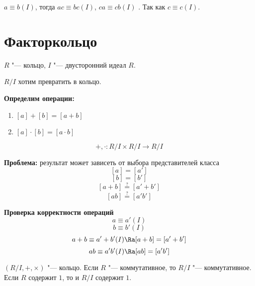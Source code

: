 \begin{conseq}	
	$a \equiv b (I)$, тогда
	$ac \equiv bc (I)$, $ca \equiv cb (I)$	.
	Так как $c \equiv c (I)$.
\end{conseq}

\section{Факторкольцо}

$R$ "--- кольцо, $I$ "--- двусторонний идеал $R$.

$R / I$ хотим превратить в кольцо.

\textbf{Определим операции:}
\begin{enumerate}
	\item $[a] + [b] = [a + b]$
	\item $[a] \cdot [b] = [a \cdot b]$
\end{enumerate}	
\[+, \cdot \colon R/I \times R/I \to R/I\]
	
\textbf{Проблема:}
результат может зависеть от выбора представителей класса
\[[a] = [a']\]
\[[b] = [b']\]
\[[a + b] \overset{?}{=} [a' + b']\]
\[[ab] \overset{?}{=} [a'b']\]
	
\textbf{Проверка корректности операций}
\[a \equiv a' (I)\]
\[b \equiv b' (I)\]
\[a + b \equiv a' + b' (I) \Ra [a + b] = [a' + b']\]
\[ab \equiv a'b' (I) \Ra [ab] = [a'b']\]
	
\begin{theorem}
	$(R/I, +, \times)$ "--- кольцо.
	Если $R$ "--- коммутативное, то $R/I$ "--- коммутативное.
	Если $R$ содержит $1$,  то и $R/I$ содержит $1$.
\end{theorem}

